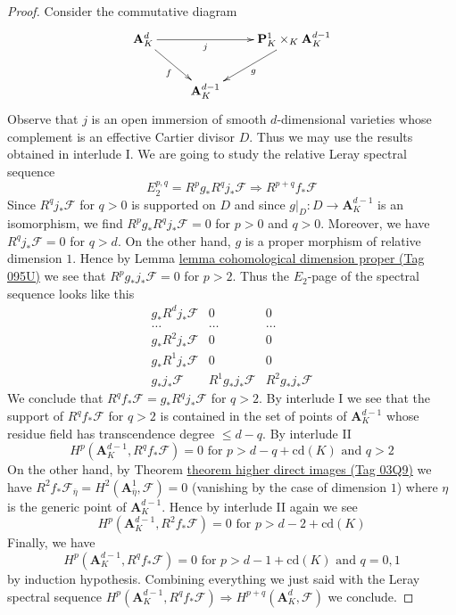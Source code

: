 \documentclass{amsart}
\theoremstyle{plain}
\theoremstyle{definition}
\theoremstyle{remark}
\numberwithin{equation}{subsection}
\begin{document}
\begin{proof}
\medskip\noindent
Consider the commutative diagram
$$
\xymatrix{
\mathbf{A}^d_K \ar[rd]_f \ar[rr]_-j & &
\mathbf{P}^1_K \times_K \mathbf{A}^{d - 1}_K \ar[ld]^g \\
& \mathbf{A}^{d - 1}_K
}
$$
Observe that $j$ is an open immersion of smooth $d$-dimensional
varieties whose complement is an effective Cartier divisor $D$. Thus
we may use the results obtained in interlude I.
We are going to study the relative Leray spectral sequence
$$
E_2^{p, q} = R^pg_*R^qj_*\mathcal{F} \Rightarrow R^{p + q}f_*\mathcal{F}
$$
Since $R^qj_*\mathcal{F}$ for $q > 0$ is supported on $D$ and since
$g|_D : D \to \mathbf{A}^{d - 1}_K$ is an isomorphism, we find
$R^pg_*R^qj_*\mathcal{F} = 0$ for $p > 0$ and $q > 0$. Moreover, we have
$R^qj_*\mathcal{F} = 0$ for $q > d$. On the other hand, $g$ is a
proper morphism of relative dimension $1$. Hence by
Lemma \href{https://stacks.math.columbia.edu/tag/095U}{lemma cohomological dimension proper (Tag 095U)}
we see that $R^pg_*j_*\mathcal{F} = 0$ for $p > 2$. Thus the $E_2$-page
of the spectral sequence looks like this
$$
\begin{matrix}
g_*R^dj_*\mathcal{F} & 0 & 0 \\
\ldots & \ldots & \ldots \\
g_*R^2j_*\mathcal{F} & 0 & 0 \\
g_*R^1j_*\mathcal{F} & 0 & 0 \\
g_*j_*\mathcal{F} & R^1g_*j_*\mathcal{F} & R^2g_*j_*\mathcal{F}
\end{matrix}
$$
We conclude that $R^qf_*\mathcal{F} = g_*R^qj_*\mathcal{F}$ for $q > 2$.
By interlude I we see that the support of $R^qf_*\mathcal{F}$ for $q > 2$
is contained in the set of points of $\mathbf{A}^{d - 1}_K$
whose residue field has transcendence degree $\leq d - q$.
By interlude II
$$
H^p(\mathbf{A}^{d - 1}_K, R^qf_*\mathcal{F}) = 0
\text{ for }p > d - q + \text{cd}(K)\text{ and }q > 2
$$
On the other hand, by Theorem \href{https://stacks.math.columbia.edu/tag/03Q9}{theorem higher direct images (Tag 03Q9)}
we have $R^2f_*\mathcal{F}_{\overline{\eta}} =
H^2(\mathbf{A}^1_{\overline{\eta}}, \mathcal{F}) = 0$
(vanishing by the case of dimension $1$) where $\eta$ is the
generic point of $\mathbf{A}^{d - 1}_K$.
Hence by interlude II again we see
$$
H^p(\mathbf{A}^{d - 1}_K, R^2f_*\mathcal{F}) = 0
\text{ for }p > d - 2 + \text{cd}(K)
$$
Finally, we have
$$
H^p(\mathbf{A}^{d - 1}_K, R^qf_*\mathcal{F}) = 0
\text{ for }p > d - 1 + \text{cd}(K)\text{ and }q = 0, 1
$$
by induction hypothesis. Combining everything we just said
with the Leray spectral sequence
$H^p(\mathbf{A}^{d - 1}_K, R^qf_*\mathcal{F}) \Rightarrow
H^{p + q}(\mathbf{A}^d_K, \mathcal{F})$ we conclude.
\end{proof}
\end{document}
